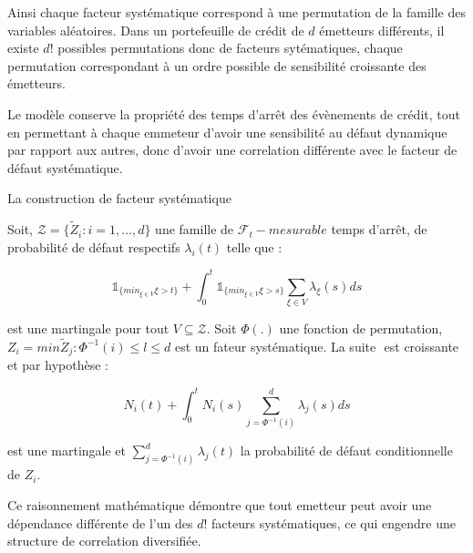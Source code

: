 \documentclass[10pt,a4paper]{article}
\begin{document}
	Ainsi chaque facteur systématique correspond à une permutation de la famille des variables aléatoires. Dans un portefeuille de crédit de $ d $ émetteurs différents, il existe $ d! $ possibles permutations donc de facteurs sytématiques, chaque permutation correspondant à un ordre possible de sensibilité croissante des émetteurs. 
	
	Le modèle conserve la propriété des temps d'arrêt des évènements de crédit, tout en permettant à chaque emmeteur d'avoir une sensibilité au défaut dynamique par rapport aux autres, donc d'avoir une correlation différente avec le facteur de défaut systématique.
	
	La construction de facteur systématique
	
	Soit, $ \mathcal{Z}  = \{ \tilde{Z}_i : i = 1,\ldots,d\} $ une famille de $ \mathcal{F}_t-mesurable $ temps d'arrêt, de probabilité de défaut respectifs $ \lambda_i(t) $ telle que :
	
	$$ \mathds{1}_{ \{ min_{ \xi \in V } \xi > t \} } + \int_0^{t} \mathds{1}_{ \{ min_{ \xi \in V } \xi > s \} } \sum_{\xi \in V} \lambda_\xi(s) ds $$
	
	
	est une martingale pour tout $ V \subseteq \mathcal{Z} $. Soit $ \varPhi(.) $ une fonction de permutation, $ Z_i = min{\tilde{Z}_j : \varPhi^{-1}(i)\leq l \leq d } $ est un fateur systématique. La suite $  $ est croissante et par hypothèse : 
	
	$$ N_i(t) + \int_0^{t} N_i(s)  \sum_{j=\varPhi^{-1}(i)}^d \lambda_j(s)ds $$ 
	
	
	
	est une martingale et $ \sum_{j = \varPhi^{-1}(i)}^{d} \lambda_j(t) $ la probabilité de défaut conditionnelle de $ Z_i $. 
	
	Ce raisonnement mathématique démontre que tout emetteur peut avoir une dépendance différente de l'un des $ d! $ facteurs systématiques, ce qui engendre une structure de correlation diversifiée. 
	
	
	
\end{document}
